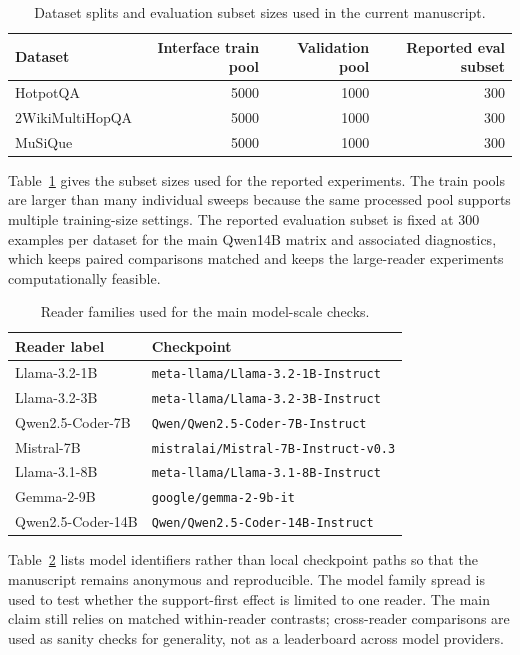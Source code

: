 \documentclass[a4paper,fleqn]{cas-sc}
\begin{document}
\begin{table}[!hbp]
\centering
\caption{Dataset splits and evaluation subset sizes used in the current
manuscript.}
\label{tab:appendix-splits}
\scriptsize
\setlength{\tabcolsep}{4pt}
\begin{tabular}{lrrr}
\toprule
Dataset & Interface train pool & Validation pool & Reported eval subset \\
\midrule
HotpotQA & 5000 & 1000 & 300 \\
2WikiMultiHopQA & 5000 & 1000 & 300 \\
MuSiQue & 5000 & 1000 & 300 \\
\bottomrule
\end{tabular}
\end{table}

Table~\ref{tab:appendix-splits} gives the subset sizes used for the reported
experiments. The train pools are larger than many individual sweeps because the
same processed pool supports multiple training-size settings. The reported
evaluation subset is fixed at 300 examples per dataset for the main Qwen14B
matrix and associated diagnostics, which keeps paired comparisons matched and
keeps the large-reader experiments computationally feasible.

\begin{table}[!hbp]
\centering
\caption{Reader families used for the main model-scale checks.}
\label{tab:appendix-models}
\scriptsize
\setlength{\tabcolsep}{4pt}
\begin{tabular}{ll}
\toprule
Reader label & Checkpoint \\
\midrule
Llama-3.2-1B & \texttt{meta-llama/Llama-3.2-1B-Instruct} \\
Llama-3.2-3B & \texttt{meta-llama/Llama-3.2-3B-Instruct} \\
Qwen2.5-Coder-7B & \texttt{Qwen/Qwen2.5-Coder-7B-Instruct} \\
Mistral-7B & \texttt{mistralai/Mistral-7B-Instruct-v0.3} \\
Llama-3.1-8B & \texttt{meta-llama/Llama-3.1-8B-Instruct} \\
Gemma-2-9B & \texttt{google/gemma-2-9b-it} \\
Qwen2.5-Coder-14B & \texttt{Qwen/Qwen2.5-Coder-14B-Instruct} \\
\bottomrule
\end{tabular}
\end{table}

Table~\ref{tab:appendix-models} lists model identifiers rather than local
checkpoint paths so that the manuscript remains anonymous and reproducible.
The model family spread is used to test whether the support-first effect is
limited to one reader. The main claim still relies on matched within-reader
contrasts; cross-reader comparisons are used as sanity checks for generality,
not as a leaderboard across model providers.
\end{document}
